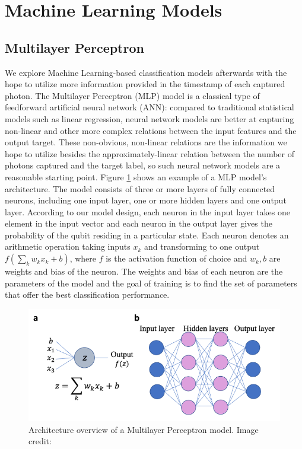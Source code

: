 \documentclass[letterpaper,twocolumn,10pt]{article}
\begin{document}
\section{Machine Learning Models}

\subsection{Multilayer Perceptron}

We explore Machine Learning-based classification models afterwards with the hope to utilize more information provided in the timestamp of each captured photon. The Multilayer Perceptron (MLP) model is a classical type of feedforward artificial neural network (ANN): compared to traditional statistical models such as linear regression, neural network models are better at capturing non-linear and other more complex relations between the input features and the output target. These non-obvious, non-linear relations are the information we hope to utilize besides the approximately-linear relation between the number of photons captured and the target label, so such neural network models are a reasonable starting point. Figure \ref{fig:mlp_architecture} shows an example of a MLP model's architecture. The model consists of three or more layers of fully connected neurons, including one input layer, one or more hidden layers and one output layer. According to our model design, each neuron in the input layer takes one element in the input vector and each neuron in the output layer gives the probability of the qubit residing in a particular state. Each neuron denotes an arithmetic operation taking inputs $x_k$ and transforming to one output $f(\sum_{k}{w_k}{x_k} + b)$, where $f$ is the activation function of choice and $w_k, b$ are weights and bias of the neuron. The weights and bias of each neuron are the parameters of the model and the goal of training is to find the set of parameters that offer the best classification performance.

\begin{figure}
    \includegraphics[width=\linewidth]{Figures/mlp_architecture.png}
    \centering
    \caption{Architecture overview of a Multilayer Perceptron model. Image credit: \cite{ml-qubit}}
    \label{fig:mlp_architecture}
\end{figure}
\end{document}
